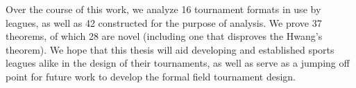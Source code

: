 {    Over the course of this work, we analyze 16 tournament formats in use by leagues, as well as 42 constructed for the purpose of analysis. We prove 37 theorems, of which 28 are novel (including one that disproves the Hwang's theorem). We hope that this thesis will aid developing and established sports leagues alike in the design of their tournaments, as well as serve as a jumping off point for future work to develop the formal field tournament design.

}



    
    




